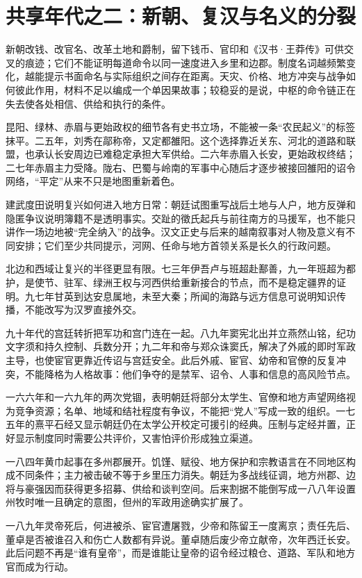 \section{共享年代之二：新朝、复汉与名义的分裂}

新朝改钱、改官名、改革土地和爵制，留下钱币、官印和《汉书·王莽传》可供交叉的痕迹；它们不能证明每道命令以同一速度进入乡里和边郡。制度名词越频繁变化，越能提示书面命名与实际组织之间存在距离。天灾、价格、地方冲突与战争如何彼此作用，材料不足以编成一个单因果故事；较稳妥的是说，中枢的命令链正在失去使各处相信、供给和执行的条件。

昆阳、绿林、赤眉与更始政权的细节各有史书立场，不能被一条“农民起义”的标签抹平。二五年，刘秀在鄗称帝，又定都雒阳。这个选择靠近关东、河北的道路和联盟，也承认长安周边已难稳定承担大军供给。二六年赤眉入长安，更始政权终结；二七年赤眉主力受降。陇右、巴蜀与岭南的军事中心随后才逐步被接回雒阳的诏令网络，“平定”从来不只是地图重新着色。

建武度田说明复兴如何进入地方日常：朝廷试图重写战后土地与人户，地方反弹和隐匿争议说明簿籍不是透明事实。交趾的徵氏起兵与前往南方的马援军，也不能只讲作一场边地被“完全纳入”的战争。汉文正史与后来的越南叙事对人物及意义有不同安排；它们至少共同提示，河网、任命与地方首领关系是长久的行政问题。

北边和西域让复兴的半径更显有限。七三年伊吾卢与班超赴鄯善，九一年班超为都护，是使节、驻军、绿洲王权与河西供给重新接合的节点，而不是稳定疆界的证明。九七年甘英到达安息属地，未至大秦；所闻的海路与远方信息可说明知识传播，不能改写为汉罗直接外交。

九十年代的宫廷转折把军功和宫门连在一起。八九年窦宪北出并立燕然山铭，纪功文字须和持久控制、兵数分开；九二年和帝与郑众诛窦氏，解决了外戚的即时军政主导，也使宦官更靠近传诏与宫廷安全。此后外戚、宦官、幼帝和官僚的反复冲突，不能降格为人格故事：他们争夺的是禁军、诏令、人事和信息的高风险节点。

一六六年和一六九年的两次党锢，表明朝廷将部分太学生、官僚和地方声望网络视为竞争资源；名单、地域和结社程度有争议，不能把“党人”写成一致的组织。一七五年的熹平石经又显示朝廷仍在太学公开校定可援引的经典。压制与定经并置，正好显示制度同时需要公共评价，又害怕评价形成独立渠道。

一八四年黄巾起事在多州郡展开。饥馑、赋役、地方保护和宗教语言在不同地区构成不同条件；主力被击破不等于乡里压力消失。朝廷为多战线征调，地方州郡、边将与豪强因而获得更多招募、供给和谈判空间。后来割据不能倒写成一八八年设置州牧时唯一且确定的意图，但州的军政用途确实扩展了。

一八九年灵帝死后，何进被杀、宦官遭屠戮，少帝和陈留王一度离京；责任先后、董卓是否被谁召入和伤亡人数都有异说。董卓随后废少帝立献帝，次年西迁长安。此后问题不再是“谁有皇帝”，而是谁能让皇帝的诏令经过粮仓、道路、军队和地方官而成为行动。


